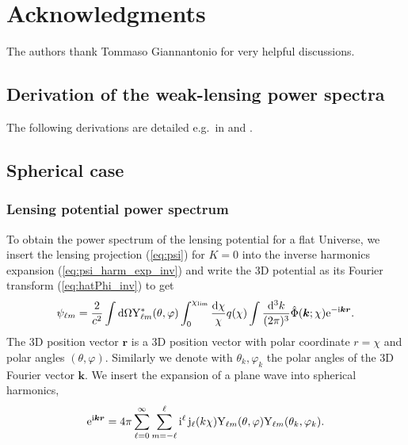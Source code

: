 \documentclass[useAMS,usenatbib]{mn2e} %
\renewcommand{\vec}{\bm}
\begin{document}
\section*{Acknowledgments}

The authors thank Tommaso Giannantonio for very helpful discussions.




\begin{appendix}

\section{Derivation of the weak-lensing power spectra}
\label{sec:derivations_C}

The following derivations are detailed e.g.~in \cite{2000PhRvD..62d3007H} and
\cite{2005PhRvD..72b3516C}.

\subsection{Spherical case}

\subsubsection{Lensing potential power spectrum}

To obtain the power spectrum of the lensing potential for a flat Universe, 
we insert the lensing projection (\ref{eq:psi}) for $K=0$ into the
inverse harmonics expansion (\ref{eq:psi_harm_exp_inv}) and write the 3D potential
as its Fourier transform (\ref{eq:hatPhi_inv}) to get
%
\begin{equation}
  \psi_{\ell m} = \frac 2 {c^2} \int {\rm d} \Omega {\rm Y}^\ast_{\ell m}(\theta, \varphi)
    \int_0^{\chi_{\rm lim}} \frac{{\rm d}\chi}{\chi} q(\chi) \int \frac{{\rm d}^3 k}{(2\pi)^3} \hat \Phi(\vec k; \chi) {\rm e}^{-{\rm i} \vec k \vec r}.
\end{equation}
%
The 3D position vector $\vec r$ is a 3D position vector with polar coordinate
$r = \chi$ and polar angles $(\theta, \varphi)$. Similarly we denote with
$\theta_k, \varphi_k$ the polar angles of the 3D Fourier vector $\vec k$. We
insert the expansion of a plane wave into spherical harmonics,
%
%
\begin{equation}
  {\rm e}^{{\rm i} \vec k \vec r} = 4 \pi \sum_{\ell=0}^{\infty} \sum_{m=-\ell}^{\ell}
    {\rm i}^\ell \, {\rm j}_\ell(k \chi)
    {\rm Y}_{\ell m}(\theta, \varphi) {\rm Y}_{\ell m}(\theta_k, \varphi_k) .
  \label{eq:wave_exp}
\end{equation}
%


\end{appendix}
\end{document}
